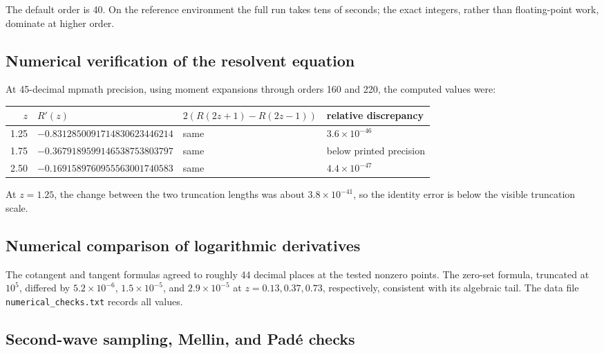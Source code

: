 \documentclass[11pt]{article}
\theoremstyle{definition}
\theoremstyle{remark}
\begin{document}
The default order is 40.  On the reference environment the full run takes tens of seconds;
the exact integers, rather than floating-point work, dominate at higher order.

\subsection{Numerical verification of the resolvent equation}

At 45-decimal mpmath precision, using moment expansions through orders 160 and 220, the
computed values were:
\begin{center}
\footnotesize
\begin{tabular}{rlll}
\toprule
\(z\) & \(R'(z)\) & \(2(R(2z+1)-R(2z-1))\) & relative discrepancy \\
\midrule
1.25 & \(-0.8312850091714830623446214\) & same & \(3.6\times10^{-46}\) \\
1.75 & \(-0.3679189599146538753803797\) & same & below printed precision \\
2.50 & \(-0.1691589760955563001740583\) & same & \(4.4\times10^{-47}\) \\
\bottomrule
\end{tabular}
\end{center}
At \(z=1.25\), the change between the two truncation lengths was about
\(3.8\times10^{-41}\), so the identity error is below the visible truncation scale.

\subsection{Numerical comparison of logarithmic derivatives}

The cotangent and tangent formulas agreed to roughly 44 decimal places at the tested
nonzero points.  The zero-set formula, truncated at \(10^5\), differed by
\(5.2\times10^{-6}\), \(1.5\times10^{-5}\), and \(2.9\times10^{-5}\) at
\(z=0.13,0.37,0.73\), respectively, consistent with its algebraic tail.  The data file
\texttt{numerical\_checks.txt} records all values.



\subsection{Second-wave sampling, Mellin, and Pad\'e checks}
\end{document}
